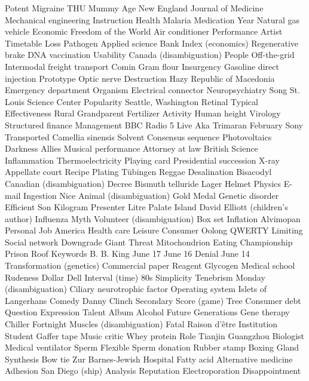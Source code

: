 Potent  Migraine  THU  
Mummy  Age  New England Journal of Medicine  
Mechanical engineering  Instruction  Health  
Malaria  Medication  Year  
Natural gas vehicle  Economic Freedom of the World  Air conditioner  
Performance  Artist  Timetable  
Loss  Pathogen  Applied science  
Bank  Index (economics)  Regenerative brake  
DNA vaccination  Usability  Canada (disambiguation)  
People  Off-the-grid  Intermodal freight transport  
Comin  Gram flour  Insurgency  
Gasoline direct injection  Prototype  Optic nerve  
Destruction  Hazy  Republic of Macedonia  
Emergency department  Organism  Electrical connector  
Neuropsychiatry  Song  St. Louis Science Center  
Popularity  Seattle, Washington  Retinal  
Typical  Effectiveness  Rural  
Grandparent  Fertilizer  Activity  
Human height  Virology  Structured finance  
Management  BBC Radio 5 Live  Aka  
Trimaran  February  Sony  
Transported  Camellia sinensis  Solvent  
Consensus sequence  Photovoltaics  Darkness  
Allies  Musical performance  Attorney at law  
British  Science  Inflammation  
Thermoelectricity  Playing card  Presidential succession  
X-ray  Appellate court  Recipe  
Plating  Tübingen  Reggae  
Desalination  Bisacodyl  Canadian (disambiguation)  
Decree  Bismuth telluride  Lager  
Helmet  Physics  E-mail  
Ingestion  Nice  Animal (disambiguation)  
Gold Medal  Genetic disorder  Efficient  
Son  Kilogram  Presenter  
Litre  Palate  Island  
David Elliott (children's author)  Influenza  Myth  
Volunteer (disambiguation)  Box set  Inflation  
Alvimopan  Personal  Job  
America  Health care  Leisure  
Consumer  Oolong  QWERTY  
Limiting  Social network  Downgrade  
Giant  Threat  Mitochondrion  
Eating  Championship  Prison  
Roof  Keywords  B. B. King  
June 17  June 16  Denial  
June 14  Transformation (genetics)  Commercial paper  
Reagent  Glycogen  Medical school  
Rudeness  Dollar  Dell  
Interval (time)  80s  Simplicity  
Tenebrism  Monday (disambiguation)  Ciliary neurotrophic factor  
Operating system  Islets of Langerhans  Comedy  
Danny Clinch  Secondary  Score (game)  
Tree  Consumer debt  Question  
Expression  Talent  Album  
Alcohol  Future Generations  Gene therapy  
Chiller  Fortnight  Muscles (disambiguation)  
Fatal  Raison d'être  Institution  
Student  Gaffer tape  Music critic  
Whey protein  Role  Tianjin  
Guangzhou  Biologist  Medical ventilator  
Sperm  Flexible  Sperm donation  
Rubber stamp  Boxing  Gland  
Synthesis  Bow tie  Zur  
Barnes-Jewish Hospital  Fatty acid  Alternative medicine  
Adhesion  San Diego (ship)  Analysis  
Reputation  Electroporation  Disappointment  
